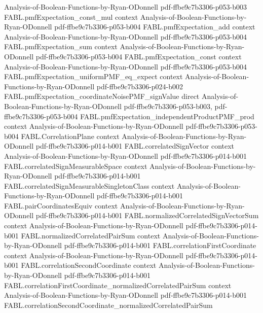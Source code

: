 \begin{theorem}
  {Analysis-of-Boolean-Functions-by-Ryan-ODonnell}
  {pdf-ffbe9c7b3306-p053-b003}
\proofstep
  {FABL.pmfExpectation_const_mul}
  {context}
  {Analysis-of-Boolean-Functions-by-Ryan-ODonnell}
  {pdf-ffbe9c7b3306-p053-b004}
\proofstep
  {FABL.pmfExpectation_add}
  {context}
  {Analysis-of-Boolean-Functions-by-Ryan-ODonnell}
  {pdf-ffbe9c7b3306-p053-b004}
\proofstep
  {FABL.pmfExpectation_sum}
  {context}
  {Analysis-of-Boolean-Functions-by-Ryan-ODonnell}
  {pdf-ffbe9c7b3306-p053-b004}
\proofstep
  {FABL.pmfExpectation_const}
  {context}
  {Analysis-of-Boolean-Functions-by-Ryan-ODonnell}
  {pdf-ffbe9c7b3306-p053-b004}
\proofstep
  {FABL.pmfExpectation_uniformPMF_eq_expect}
  {context}
  {Analysis-of-Boolean-Functions-by-Ryan-ODonnell}
  {pdf-ffbe9c7b3306-p024-b002}
\proofstep
  {FABL.pmfExpectation_coordinateNoisePMF_signValue}
  {direct}
  {Analysis-of-Boolean-Functions-by-Ryan-ODonnell}
  {pdf-ffbe9c7b3306-p053-b003,
    pdf-ffbe9c7b3306-p053-b004}
\proofstep
  {FABL.pmfExpectation_independentProductPMF_prod}
  {context}
  {Analysis-of-Boolean-Functions-by-Ryan-ODonnell}
  {pdf-ffbe9c7b3306-p053-b004}
\proofstep
  {FABL.CorrelationPlane}
  {context}
  {Analysis-of-Boolean-Functions-by-Ryan-ODonnell}
  {pdf-ffbe9c7b3306-p014-b001}
\proofstep
  {FABL.correlatedSignVector}
  {context}
  {Analysis-of-Boolean-Functions-by-Ryan-ODonnell}
  {pdf-ffbe9c7b3306-p014-b001}
\proofstep
  {FABL.correlatedSignMeasurableSpace}
  {context}
  {Analysis-of-Boolean-Functions-by-Ryan-ODonnell}
  {pdf-ffbe9c7b3306-p014-b001}
\proofstep
  {FABL.correlatedSignMeasurableSingletonClass}
  {context}
  {Analysis-of-Boolean-Functions-by-Ryan-ODonnell}
  {pdf-ffbe9c7b3306-p014-b001}
\proofstep
  {FABL.pairCoordinatesEquiv}
  {context}
  {Analysis-of-Boolean-Functions-by-Ryan-ODonnell}
  {pdf-ffbe9c7b3306-p014-b001}
\proofstep
  {FABL.normalizedCorrelatedSignVectorSum}
  {context}
  {Analysis-of-Boolean-Functions-by-Ryan-ODonnell}
  {pdf-ffbe9c7b3306-p014-b001}
\proofstep
  {FABL.normalizedCorrelatedPairSum}
  {context}
  {Analysis-of-Boolean-Functions-by-Ryan-ODonnell}
  {pdf-ffbe9c7b3306-p014-b001}
\proofstep
  {FABL.correlationFirstCoordinate}
  {context}
  {Analysis-of-Boolean-Functions-by-Ryan-ODonnell}
  {pdf-ffbe9c7b3306-p014-b001}
\proofstep
  {FABL.correlationSecondCoordinate}
  {context}
  {Analysis-of-Boolean-Functions-by-Ryan-ODonnell}
  {pdf-ffbe9c7b3306-p014-b001}
\proofstep
  {FABL.correlationFirstCoordinate_normalizedCorrelatedPairSum}
  {context}
  {Analysis-of-Boolean-Functions-by-Ryan-ODonnell}
  {pdf-ffbe9c7b3306-p014-b001}
\proofstep
  {FABL.correlationSecondCoordinate_normalizedCorrelatedPairSum}

\end{theorem}
